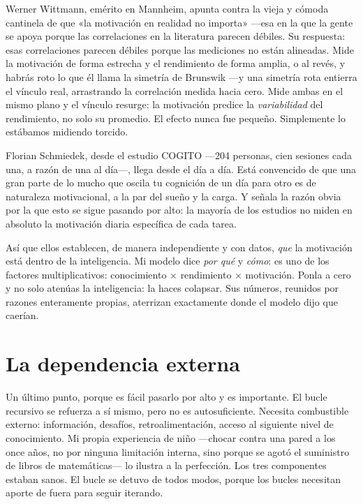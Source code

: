 \documentclass[11pt, twoside, openright]{book}
\begin{document}
Werner Wittmann, emérito en Mannheim, apunta contra la vieja y cómoda cantinela de que «la motivación en realidad no importa» ---esa en la que la gente se apoya porque las correlaciones en la literatura parecen débiles. Su respuesta: esas correlaciones parecen débiles porque las mediciones no están alineadas. Mide la motivación de forma estrecha y el rendimiento de forma amplia, o al revés, y habrás roto lo que él llama la simetría de Brunswik ---y una simetría rota entierra el vínculo real, arrastrando la correlación medida hacia cero. Mide ambas en el mismo plano y el vínculo resurge: la motivación predice la \textit{variabilidad} del rendimiento, no solo su promedio. El efecto nunca fue pequeño. Simplemente lo estábamos midiendo torcido.

Florian Schmiedek, desde el estudio COGITO ---204 personas, cien sesiones cada una, a razón de una al día---, llega desde el día a día. Está convencido de que una gran parte de lo mucho que oscila tu cognición de un día para otro es de naturaleza motivacional, a la par del sueño y la carga. Y señala la razón obvia por la que esto se sigue pasando por alto: la mayoría de los estudios no miden en absoluto la motivación diaria específica de cada tarea.

Así que ellos establecen, de manera independiente y con datos, \textit{que} la motivación está dentro de la inteligencia. Mi modelo dice \textit{por qué} y \textit{cómo}: es uno de los factores multiplicativos: conocimiento × rendimiento × motivación. Ponla a cero y no solo atenúas la inteligencia: la haces colapsar. Sus números, reunidos por razones enteramente propias, aterrizan exactamente donde el modelo dijo que caerían.

\section*{La dependencia externa}

Un último punto, porque es fácil pasarlo por alto y es importante. El bucle recursivo se refuerza a sí mismo, pero no es autosuficiente. Necesita combustible externo: información, desafíos, retroalimentación, acceso al siguiente nivel de conocimiento. Mi propia experiencia de niño ---chocar contra una pared a los once años, no por ninguna limitación interna, sino porque se agotó el suministro de libros de matemáticas--- lo ilustra a la perfección. Los tres componentes estaban sanos. El bucle se detuvo de todos modos, porque los bucles necesitan aporte de fuera para seguir iterando.
\end{document}
